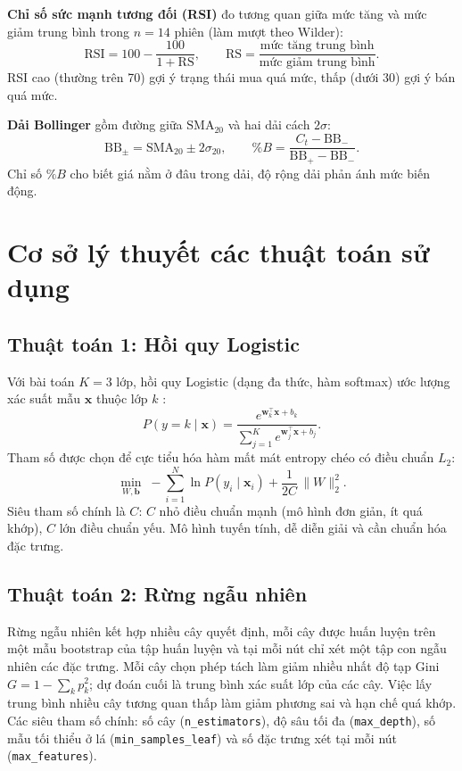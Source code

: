 \documentclass[12pt,a4paper,oneside]{report}
\begin{document}
\textbf{Chỉ số sức mạnh tương đối (RSI)} \cite{wilder1978} đo tương quan giữa
mức tăng và mức giảm trung bình trong $n=14$ phiên (làm mượt theo Wilder):
\begin{equation}
  \mathrm{RSI}=100-\frac{100}{1+\mathrm{RS}},\qquad
  \mathrm{RS}=\frac{\text{mức tăng trung bình}}{\text{mức giảm trung bình}}.
  \label{eq:rsi}
\end{equation}
RSI cao (thường trên 70) gợi ý trạng thái mua quá mức, thấp (dưới 30) gợi ý bán
quá mức.

\textbf{Dải Bollinger} gồm đường giữa $\mathrm{SMA}_{20}$ và hai dải cách $2\sigma$:
\begin{equation}
  \mathrm{BB}_{\pm}=\mathrm{SMA}_{20}\pm 2\sigma_{20},\qquad
  \%B=\frac{C_t-\mathrm{BB}_{-}}{\mathrm{BB}_{+}-\mathrm{BB}_{-}}.
  \label{eq:bb}
\end{equation}
Chỉ số $\%B$ cho biết giá nằm ở đâu trong dải, độ rộng dải phản ánh mức biến động.

\section{Cơ sở lý thuyết các thuật toán sử dụng}

\subsection{Thuật toán 1: Hồi quy Logistic}
Với bài toán $K=3$ lớp, hồi quy Logistic (dạng đa thức, hàm softmax) ước lượng
xác suất mẫu $\mathbf{x}$ thuộc lớp $k$ \cite{hastie2009}:
\begin{equation}
  P(y=k \mid \mathbf{x})=\frac{e^{\mathbf{w}_k^{\top}\mathbf{x}+b_k}}
  {\sum_{j=1}^{K} e^{\mathbf{w}_j^{\top}\mathbf{x}+b_j}}.
  \label{eq:softmax}
\end{equation}
Tham số được chọn để cực tiểu hóa hàm mất mát entropy chéo có điều chuẩn $L_2$:
\begin{equation}
  \min_{W,\mathbf{b}}\; -\sum_{i=1}^{N}\ln P(y_i\mid\mathbf{x}_i)
  +\frac{1}{2C}\,\lVert W\rVert_2^2 .
  \label{eq:lrloss}
\end{equation}
Siêu tham số chính là $C$: $C$ nhỏ điều chuẩn mạnh (mô hình đơn giản, ít quá khớp),
$C$ lớn điều chuẩn yếu. Mô hình tuyến tính, dễ diễn giải và cần chuẩn hóa đặc trưng.

\subsection{Thuật toán 2: Rừng ngẫu nhiên}
Rừng ngẫu nhiên \cite{breiman2001} kết hợp nhiều cây quyết định, mỗi cây được huấn
luyện trên một mẫu bootstrap của tập huấn luyện và tại mỗi nút chỉ xét một tập con
ngẫu nhiên các đặc trưng. Mỗi cây chọn phép tách làm giảm nhiều nhất độ tạp
Gini $G=1-\sum_k p_k^2$; dự đoán cuối là trung bình xác suất lớp của các cây. Việc
lấy trung bình nhiều cây tương quan thấp làm giảm phương sai và hạn chế quá khớp.
Các siêu tham số chính: số cây (\texttt{n\_estimators}), độ sâu tối đa
(\texttt{max\_depth}), số mẫu tối thiểu ở lá (\texttt{min\_samples\_leaf}) và số đặc
trưng xét tại mỗi nút (\texttt{max\_features}).
\end{document}
